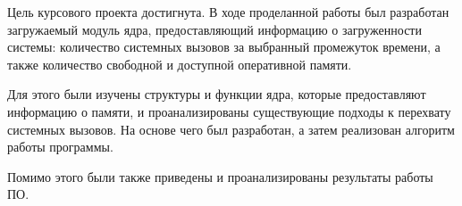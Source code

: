 
Цель курсового проекта достигнута. В ходе проделанной работы был разработан загружаемый модуль ядра, предоставляющий информацию о загруженности системы: количество системных вызовов за выбранный промежуток времени, а также количество свободной и доступной оперативной памяти.

Для этого были изучены структуры и функции ядра, которые предоставляют информацию о памяти, и проанализированы существующие подходы к перехвату системных вызовов. На основе чего был разработан, а затем реализован алгоритм работы программы.

Помимо этого были также приведены и проанализированы результаты работы ПО.